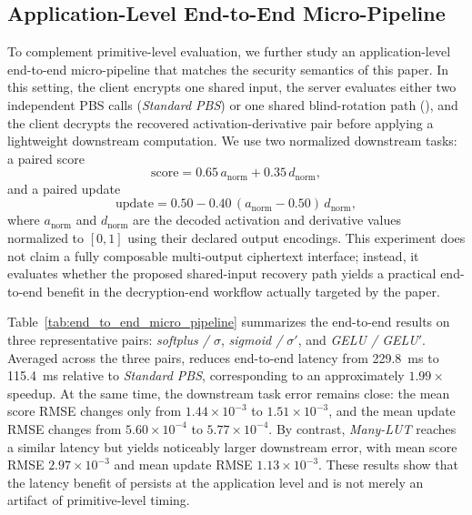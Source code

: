 
\subsection{Application-Level End-to-End Micro-Pipeline}
\label{subsec:end_to_end_results}

To complement primitive-level evaluation, we further study an application-level end-to-end micro-pipeline that matches the security semantics of this paper. In this setting, the client encrypts one shared input, the server evaluates either two independent PBS calls (\emph{Standard PBS}) or one shared blind-rotation path (\emph{\SDRPBS}), and the client decrypts the recovered activation-derivative pair before applying a lightweight downstream computation. We use two normalized downstream tasks: a paired score
\[
\mathrm{score}=0.65\,a_{\mathrm{norm}}+0.35\,d_{\mathrm{norm}},
\]
and a paired update
\[
\mathrm{update}=0.50-0.40\,(a_{\mathrm{norm}}-0.50)\,d_{\mathrm{norm}},
\]
where $a_{\mathrm{norm}}$ and $d_{\mathrm{norm}}$ are the decoded activation and derivative values normalized to $[0,1]$ using their declared output encodings. This experiment does not claim a fully composable multi-output ciphertext interface; instead, it evaluates whether the proposed shared-input recovery path yields a practical end-to-end benefit in the decryption-end workflow actually targeted by the paper.

Table~\ref{tab:end_to_end_micro_pipeline} summarizes the end-to-end results on three representative pairs: \emph{softplus / $\sigma$}, \emph{sigmoid / $\sigma'$}, and \emph{GELU / GELU$'$}. Averaged across the three pairs, \emph{\SDRPBS} reduces end-to-end latency from 229.8~ms to 115.4~ms relative to \emph{Standard PBS}, corresponding to an approximately $1.99\times$ speedup. At the same time, the downstream task error remains close: the mean score RMSE changes only from $1.44\times 10^{-3}$ to $1.51\times 10^{-3}$, and the mean update RMSE changes from $5.60\times 10^{-4}$ to $5.77\times 10^{-4}$. By contrast, \emph{Many-LUT} reaches a similar latency but yields noticeably larger downstream error, with mean score RMSE $2.97\times 10^{-3}$ and mean update RMSE $1.13\times 10^{-3}$. These results show that the latency benefit of \SDRPBS persists at the application level and is not merely an artifact of primitive-level timing.

